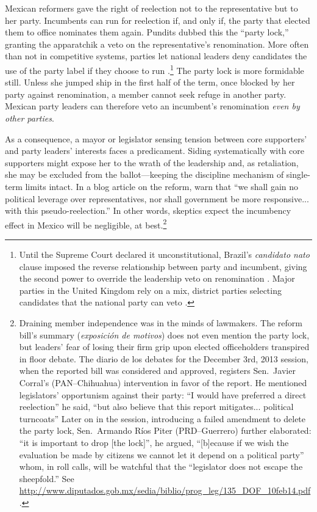 \documentclass[letter,12pt]{article}
\begin{document}
Mexican reformers gave the right of reelection not to the representative but to her party. Incumbents can run for reelection if, and only if, the party that elected them to office nominates them again. Pundits dubbed this the ``party lock,'' granting the apparatchik a veto on the representative's renomination. More often than not in competitive systems, parties let national leaders deny candidates the use of the party label if they choose to run \citep[:85]{ranney.cand-sel.1981}.\footnote{Until the Supreme Court declared it unconstitutional, Brazil's \emph{candidato nato} clause imposed the reverse relationship between party and incumbent, giving the second power to override the leadership veto on renomination \citep{mainwaring.1991}. Major parties in the United Kingdom rely on a mix, district parties selecting candidates that the national party can veto \citep{mikulska.uk.cand.sel2010}.} The party lock is more formidable still. Unless she jumped ship in the first half of the term, once blocked by her party against renomination, a member cannot seek refuge in another party. Mexican party leaders can therefore veto an incumbent's renomination \emph{even by other parties}. 

As a consequence, a mayor or legislator sensing tension between core supporters' and party leaders' interests faces a predicament. Siding systematically with core supporters might expose her to the wrath of the leadership and, as retaliation, she may be excluded from the ballot---keeping the discipline mechanism of single-term limits \citep{weldon.1997} intact. In a blog article on the reform, \citet{merinoFierroZarkin2013Blog} warn that ``we shall gain no political leverage over representatives, nor shall government be more responsive... with this pseudo-reelection.'' In other words, skeptics expect the incumbency effect in Mexico will be negligible, at best.\footnote{Draining member independence was in the minds of lawmakers. The reform bill's summary (\emph{exposición de motivos}) does not even mention the party lock, but leaders' fear of losing their firm grip upon elected officeholders transpired in floor debate. The diario de los debates for the December 3rd, 2013 session, when the reported bill was considered and approved, registers Sen.\ Javier Corral's (PAN--Chihuahua) intervention in favor of the report. He mentioned legislators' opportunism against their party: ``I would have preferred a direct reelection'' he said, ``but also believe that this report mitigates... political turncoats'' Later on in the session, introducing a failed amendment to delete the party lock, Sen.\ Armando Ríos Piter (PRD--Guerrero) further elaborated: ``it is important to drop [the lock]'', he argued, ``[b]ecause if we wish the evaluation be made by citizens we cannot let it depend on a political party'' whom, in roll calls, will be watchful that the ``legislator does not escape the sheepfold.'' See \url{http://www.diputados.gob.mx/sedia/biblio/prog_leg/135_DOF_10feb14.pdf}.}
\end{document}
